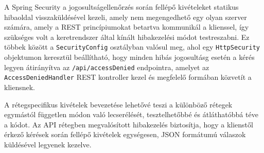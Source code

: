 A Spring Security a jogosultságellenőrzés során fellépő kivételeket statikus hibaoldal visszaküldésével kezeli, amely nem megengedhető egy olyan szerver számára, amely a REST princípiumokat betartva kommunikál a klienssel, így szükséges volt a keretrendszer által kínált hibakezelési módot testreszabni. Ez többek között a \texttt{SecurityConfig} osztályban valósul meg, ahol egy \texttt{HttpSecurity} objektumon keresztül beállítható, hogy minden hibás jogosultásg esetén a kérés legyen átirányítva az \texttt{/api/accessDenied} endpointra, amelyet az \texttt{AccessDeniedHandler} REST kontroller kezel és megfelelő formában közvetít a kliensnek.

A rétegspecifikus kivételek bevezetése lehetővé teszi a különböző rétegek egymástól független módon való lecserélését, tesztelhetőbbé és átláthatóbbá téve a kódot. Az API rétegben megvalósított hibakezelés biztosítja, hogy a klienstől érkező kérések során fellépő kivételek egységesen, JSON formátumú válaszok küldésével legyenek kezelve. 